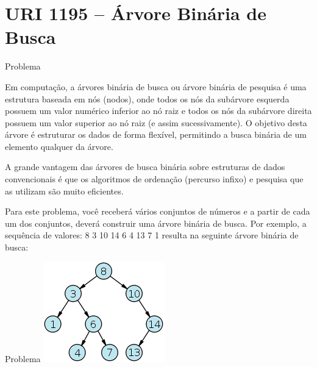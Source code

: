 \section{URI 1195 -- Árvore Binária de Busca}

\begin{frame}[fragile]{Problema}

Em computação, a árvores binária de busca ou árvore binária de pesquisa é uma estrutura baseada em nós (nodos), onde todos os nós da subárvore esquerda possuem um valor numérico inferior ao nó raiz e todos os nós da subárvore direita possuem um valor superior ao nó raiz (e assim sucessivamente). O objetivo desta árvore é estruturar os dados de forma flexível, permitindo a busca binária de um elemento qualquer da árvore.

A grande vantagem das árvores de busca binária sobre estruturas de dados convencionais é que os algoritmos de ordenação (percurso infixo) e pesquisa que as utilizam são muito eficientes.

Para este problema, você receberá vários conjuntos de números e a partir de cada um dos conjuntos, deverá construir uma árvore binária de busca. Por exemplo, a sequência de valores: 8 3 10 14 6 4 13 7 1 resulta na seguinte árvore binária de busca:

\end{frame}


\begin{frame}[fragile]{Problema}
    \includegraphics[scale=1,center]{UOJ_1195.png}
\end{frame}

